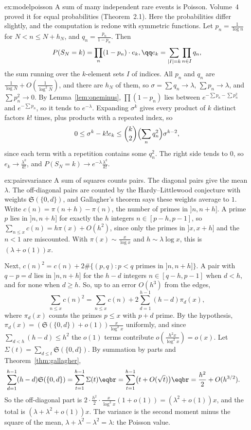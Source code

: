 \begin{solution}{ex:modelpoisson}
\idea A sum of many independent rare events is Poisson. Volume~4 proved it for equal probabilities (Theorem~2.1). Here the probabilities differ slightly, and the computation is redone with symmetric functions.
\writeup Let $p_n=\frac1{\log n}$ for $N<n\le N+h_N$, and $q_n=\frac{p_n}{1-p_n}$. Then
\[
P(S_N=k)=\prod_n(1-p_n)\cdot e_k,\qq e_k=\sum_{|I|=k}\prod_{n\in I}q_n,
\]
the sum running over the $k$-element sets $I$ of indices. All $p_n$ and $q_n$ are $\frac1{\log N}+O(\frac1{\log^2N})$, and there are $h_N$ of them, so $\sigma=\sum q_n\to\lambda$, $\sum p_n\to\lambda$, and $\sum p_n^2\to0$. By
Lemma~\ref{lem:oneminus}, $\prod(1-p_n)$ lies between $e^{-\sum p_n-\sum p_n^2}$ and $e^{-\sum p_n}$, so it tends to $e^{-\lambda}$. Expanding $\sigma^k$ gives every product of $k$ distinct factors $k!$ times, plus products
with a repeated index, so
\[
0\le\sigma^k-k!e_k\le\binom k2\Bigl(\sum_nq_n^2\Bigr)\sigma^{k-2},
\]
since each term with a repetition contains some $q_n^2$. The right side tends to $0$, so $e_k\to\frac{\lambda^k}{k!}$, and $P(S_N=k)\to e^{-\lambda}\frac{\lambda^k}{k!}$.
\end{solution}

\begin{solution}{ex:pairsvariance}
\idea A sum of squares counts pairs. The diagonal pairs give the mean $\lambda$. The off-diagonal pairs are counted by the Hardy--Littlewood conjecture with weights $\mathfrak S(\{0,d\})$, and Gallagher's theorem says these weights average to $1$.
\writeup Write $c(n)=\pi(n+h)-\pi(n)$, the number of primes in $]n,n+h]$. A prime $p$ lies in $]n,n+h]$ for exactly the $h$ integers $n\in[p-h,p-1]$, so
$\sum_{n\le x}c(n)=h\pi(x)+O(h^2)$, since only the primes in $]x,x+h]$ and the $n<1$ are miscounted. With $\pi(x)\sim\frac x{\log x}$ and $h\sim\lambda\log x$, this is $(\lambda+o(1))x$.

Next, $c(n)^2=c(n)+2\#\{(p,q):p<q\text{ primes in }]n,n+h]\}$. A pair with $q-p=d$ lies in $]n,n+h]$ for the $h-d$ integers $n\in[q-h,p-1]$ when $d<h$, and for none when $d\ge h$. So, up to an error $O(h^3)$ from the edges,
\[
\sum_{n\le x}c(n)^2=\sum_{n\le x}c(n)+2\sum_{d=1}^{h-1}(h-d)\pi_d(x),
\]
where $\pi_d(x)$ counts the primes $p\le x$ with $p+d$ prime. By the hypothesis, $\pi_d(x)=(\mathfrak S(\{0,d\})+o(1))\frac x{\log^2x}$ uniformly, and since $\sum_{d<h}(h-d)\le h^2$ the $o(1)$ terms contribute
$o(\frac{h^2x}{\log^2x})=o(x)$. Let $\Sigma(t)=\sum_{d\le t}\mathfrak S(\{0,d\})$. By summation by parts and Theorem~\ref{thm:gallagher},
\[
\begin{aligned}\sum_{d=1}^{h-1}(h-d)\mathfrak S(\{0,d\})&=\sum_{t=1}^{h-1}\Sigma(t)\eqbr=\sum_{t=1}^{h-1}\bigl(t+O(\sqrt t)\bigr)\eqbr=\frac{h^2}2+O(h^{3/2}).\end{aligned}
\]
So the off-diagonal part is $2\cdot\frac{h^2}2\cdot\frac x{\log^2x}(1+o(1))=(\lambda^2+o(1))x$, and the total is $(\lambda+\lambda^2+o(1))x$. The variance is the second moment minus the square of the mean,
$\lambda+\lambda^2-\lambda^2=\lambda$: the Poisson value.
\end{solution}

